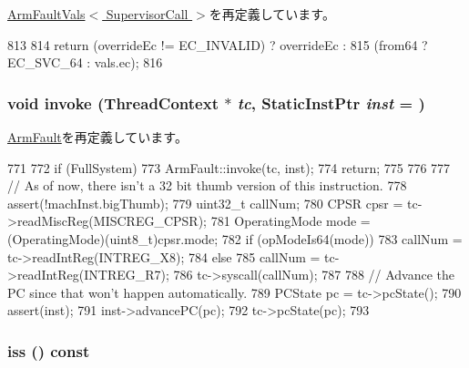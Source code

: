 \hyperlink{classArmISA_1_1ArmFaultVals_aa4dd5fb47a1253dbe17e692e905a8c7c}{ArmFaultVals$<$ SupervisorCall $>$}を再定義しています。


\begin{DoxyCode}
813 {
814     return (overrideEc != EC_INVALID) ? overrideEc :
815         (from64 ? EC_SVC_64 : vals.ec);
816 }
\end{DoxyCode}
\hypertarget{classArmISA_1_1SupervisorCall_a2bd783b42262278d41157d428e1f8d6f}{
\subsubsection[{invoke}]{\setlength{\rightskip}{0pt plus 5cm}void invoke ({\bf ThreadContext} $\ast$ {\em tc}, \/  {\bf StaticInstPtr} {\em inst} = {})}}
\label{classArmISA_1_1SupervisorCall_a2bd783b42262278d41157d428e1f8d6f}


\hyperlink{classArmISA_1_1ArmFault_a2bd783b42262278d41157d428e1f8d6f}{ArmFault}を再定義しています。


\begin{DoxyCode}
771 {
772     if (FullSystem) {
773         ArmFault::invoke(tc, inst);
774         return;
775     }
776 
777     // As of now, there isn't a 32 bit thumb version of this instruction.
778     assert(!machInst.bigThumb);
779     uint32_t callNum;
780     CPSR cpsr = tc->readMiscReg(MISCREG_CPSR);
781     OperatingMode mode = (OperatingMode)(uint8_t)cpsr.mode;
782     if (opModeIs64(mode))
783         callNum = tc->readIntReg(INTREG_X8);
784     else
785         callNum = tc->readIntReg(INTREG_R7);
786     tc->syscall(callNum);
787 
788     // Advance the PC since that won't happen automatically.
789     PCState pc = tc->pcState();
790     assert(inst);
791     inst->advancePC(pc);
792     tc->pcState(pc);
793 }
\end{DoxyCode}
\hypertarget{classArmISA_1_1SupervisorCall_a54f4d33ac162a95fd5b3830cf7fab8ff}{
\subsubsection[{iss}]{ iss () const}}
\label{classArmISA_1_1SupervisorCall_a54f4d33ac162a95fd5b3830cf7fab8ff}


